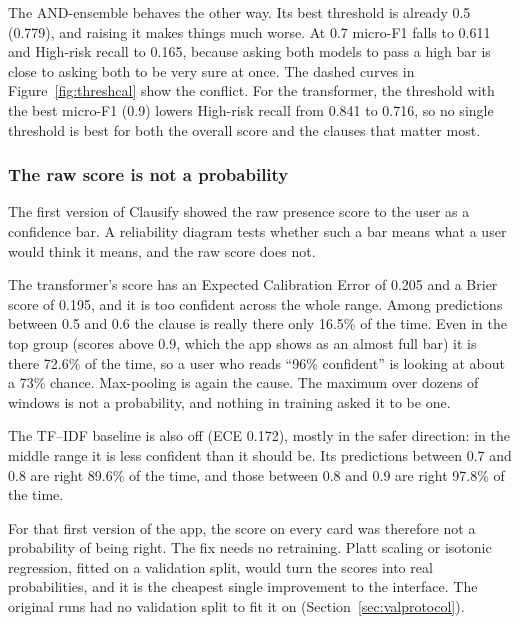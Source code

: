 The AND-ensemble behaves the other way. Its best threshold is already 0.5 (0.779), and raising it makes things much worse. At 0.7 micro-F1 falls to 0.611 and High-risk recall to 0.165, because asking both models to pass a high bar is close to asking both to be very sure at once. The dashed curves in Figure~\ref{fig:threshcal} show the conflict. For the transformer, the threshold with the best micro-F1 (0.9) lowers High-risk recall from 0.841 to 0.716, so no single threshold is best for both the overall score and the clauses that matter most.

\subsubsection{The raw score is not a probability}
The first version of Clausify showed the raw presence score to the user as a confidence bar. A reliability diagram tests whether such a bar means what a user would think it means, and the raw score does not.

The transformer's score has an Expected Calibration Error \cite{guo2017calibration} of 0.205 and a Brier score of 0.195, and it is too confident across the whole range. Among predictions between 0.5 and 0.6 the clause is really there only 16.5\% of the time. Even in the top group (scores above 0.9, which the app shows as an almost full bar) it is there 72.6\% of the time, so a user who reads ``96\% confident'' is looking at about a 73\% chance. Max-pooling is again the cause. The maximum over dozens of windows is not a probability, and nothing in training asked it to be one.

The TF--IDF baseline is also off (ECE 0.172), mostly in the safer direction: in the middle range it is less confident than it should be. Its predictions between 0.7 and 0.8 are right 89.6\% of the time, and those between 0.8 and 0.9 are right 97.8\% of the time.

For that first version of the app, the score on every card was therefore not a probability of being right. The fix needs no retraining. Platt scaling or isotonic regression, fitted on a validation split, would turn the scores into real probabilities, and it is the cheapest single improvement to the interface. The original runs had no validation split to fit it on (Section~\ref{sec:valprotocol}).

